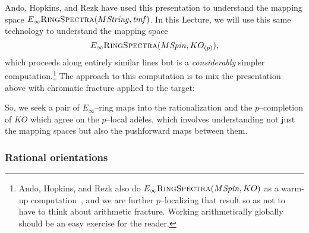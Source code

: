 Ando, Hopkins, and Rezk have used this presentation to understand the mapping space \(E_\infty\normalfont\textsc{RingSpectra}(M\mathit{String}, \mathit{tmf})\).  In this Lecture, we will use this same technology to understand the mapping space \[E_\infty\normalfont\textsc{RingSpectra}(M\mathit{Spin}, KO_{(p)}),\] which proceeds along entirely similar lines but is a \emph{considerably} simpler computation.\footnote{Ando, Hopkins, and Rezk also do \(E_\infty\normalfont\textsc{RingSpectra}(M\mathit{Spin}, KO)\) as a warm-up computation~\cite[Section 7]{AHR}, and we are further \(p\)--localizing that result so as not to have to think about arithmetic fracture.  Working arithmetically globally should be an easy exercise for the reader.}  The approach to this computation is to mix the presentation above with chromatic fracture applied to the target:
\begin{center}
\end{center}
So, we seek a pair of \(E_\infty\)--ring maps into the rationalization and the \(p\)--completion of \(KO\) which agree on the \(p\)--local ad\`eles, which involves understanding not just the mapping spaces but also the pushforward maps between them.





\subsubsection{Rational orientations}

